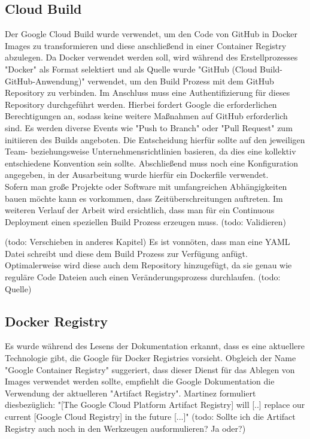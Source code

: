 \documentclass[pdftex,a4paper,abstracton,11pt,parskip=half,bibtotocnumbered]{scrartcl}
\begin{document}
	\subsection{Cloud Build}
	Der Google Cloud Build wurde verwendet, um den Code von GitHub in Docker Images zu transformieren und diese anschließend in einer Container Registry 
	abzulegen. Da Docker verwendet werden soll, wird während des Erstellprozesses "Docker" als Format selektiert und als Quelle wurde "GitHub 
	(Cloud Build-GitHub-Anwendung)" verwendet, um den Build Prozess mit dem GitHub Repository zu verbinden. Im Anschluss muss eine Authentifizierung für dieses
	Repository durchgeführt werden. Hierbei fordert Google die erforderlichen Berechtigungen an, sodass keine weitere Maßnahmen auf GitHub erforderlich sind. 
	Es werden diverse Events wie "Push to Branch" oder "Pull Request" zum initiieren des Builds angeboten. Die Entscheidung hierfür sollte auf den
	jeweiligen Team- beziehungsweise Unternehmensrichtlinien basieren, da dies eine kollektiv entschiedene Konvention sein sollte.
	Abschließend muss noch eine Konfiguration angegeben, in der Ausarbeitung wurde hierfür ein Dockerfile verwendet.\\
	Sofern man große Projekte oder Software mit umfangreichen Abhängigkeiten bauen möchte kann es vorkommen, dass Zeitüberschreitungen auftreten.  
	Im weiteren Verlauf der Arbeit wird ersichtlich, dass man für ein Continuous Deployment einen speziellen Build Prozess erzeugen muss. (todo: Validieren)

	
	(todo: Verschieben in anderes Kapitel) Es ist vonnöten, dass man eine YAML Datei schreibt und diese dem Build Prozess zur Verfügung anfügt. Optimalerweise wird diese auch dem Repository 
	hinzugefügt, da sie genau wie reguläre Code Dateien auch einen Veränderungsprozess durchlaufen. (todo: Quelle)

	\subsection{Docker Registry}
	Es wurde während des Lesens der Dokumentation erkannt, dass es eine aktuellere Technologie gibt, die Google für Docker Registries vorsieht.
	Obgleich der Name "Google Container Registry" suggeriert, dass dieser Dienst für das Ablegen von Images verwendet werden sollte, empfiehlt die Google
	Dokumentation die Verwendung der aktuelleren "Artifact Registry". Martinez formuliert diesbezüglich: "[The Google Cloud Platform Artifact 
	Registry] will [..] replace our current [Google Cloud Registry] in the future [...]" \cite{martinez_2020} 
	(todo: Sollte ich die Artifact Registry auch noch in den Werkzeugen ausformulieren? Ja oder?)
\end{document}
